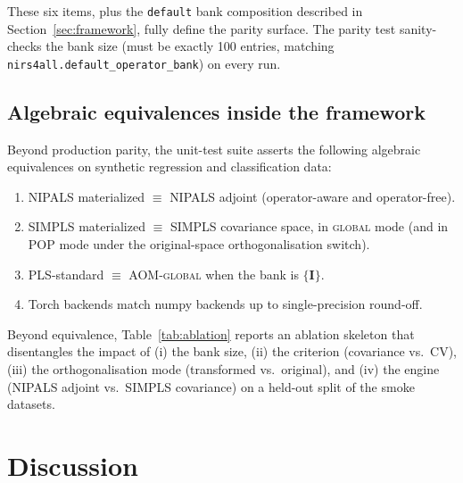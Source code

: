 \documentclass[review,a4paper]{elsarticle}
\newcommand{\identity}{\mathbf{I}}
\newcommand{\AOM}{\textsc{AOM}\xspace}
\newcommand{\POP}{\textsc{POP}\xspace}
\newcommand{\PLS}{\textsc{PLS}\xspace}
\newcommand{\NIPALS}{\textsc{NIPALS}\xspace}
\newcommand{\SIMPLS}{\textsc{SIMPLS}\xspace}
\begin{document}
These six items, plus the \texttt{default} bank composition described
in Section~\ref{sec:framework}, fully define the parity surface. The
parity test sanity-checks the bank size (must be exactly 100 entries,
matching \verb|nirs4all.default_operator_bank|) on every run.

\subsection{Algebraic equivalences inside the framework}

Beyond production parity, the unit-test suite asserts the following
algebraic equivalences on synthetic regression and classification
data:
\begin{enumerate}[leftmargin=2em]
  \item \NIPALS materialized $\equiv$ \NIPALS adjoint (operator-aware
        and operator-free).
  \item \SIMPLS materialized $\equiv$ \SIMPLS covariance space, in
        \textsc{global} mode (and in \POP mode under the original-space
        orthogonalisation switch).
  \item \PLS-standard $\equiv$ \AOM-\textsc{global} when the bank is
        $\{\identity\}$.
  \item Torch backends match numpy backends up to single-precision
        round-off.
\end{enumerate}
Beyond equivalence, Table~\ref{tab:ablation} reports an ablation skeleton
that disentangles the impact of (i) the bank size,
(ii) the criterion (covariance vs.\ CV), (iii) the orthogonalisation
mode (transformed vs.\ original), and (iv) the engine (\NIPALS adjoint
vs.\ \SIMPLS covariance) on a held-out split of the smoke datasets.

\begin{table}[t]
\centering
\caption{Ablation skeleton. Each cell reports mean RMSEP on the held-out
splits of the smoke regression datasets, together with the median
selected component count.}
\label{tab:ablation}

\end{table}

\section{Discussion}\label{sec:discussion}
\end{document}
